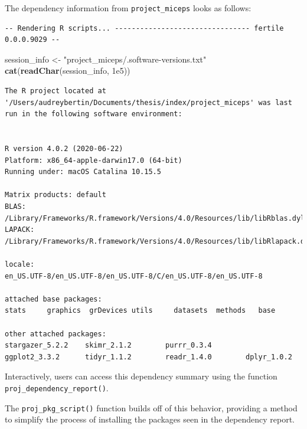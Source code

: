 \documentclass[12pt,twoside]{reedthesis}
\newenvironment{Shaded}{\begin{snugshade}}{\end{snugshade}}
\newcommand{\KeywordTok}[1]{\textcolor[rgb]{0.13,0.29,0.53}{\textbf{#1}}}
\newcommand{\FloatTok}[1]{\textcolor[rgb]{0.00,0.00,0.81}{#1}}
\newcommand{\StringTok}[1]{\textcolor[rgb]{0.31,0.60,0.02}{#1}}
\newcommand{\NormalTok}[1]{#1}
\begin{document}
The dependency information from \texttt{project\_miceps} looks as
follows:
\begin{verbatim}
-- Rendering R scripts... -------------------------------- fertile 0.0.0.9029 --
\end{verbatim}
\begin{Shaded}
\begin{Highlighting}[]
\NormalTok{session_info <-}\StringTok{ "project_miceps/.software-versions.txt"}
\KeywordTok{cat}\NormalTok{(}\KeywordTok{readChar}\NormalTok{(session_info, }\FloatTok{1e5}\NormalTok{))}
\end{Highlighting}
\end{Shaded}
\begin{verbatim}
The R project located at '/Users/audreybertin/Documents/thesis/index/project_miceps' was last run in the following software environment:


R version 4.0.2 (2020-06-22)
Platform: x86_64-apple-darwin17.0 (64-bit)
Running under: macOS Catalina 10.15.5

Matrix products: default
BLAS:   /Library/Frameworks/R.framework/Versions/4.0/Resources/lib/libRblas.dylib
LAPACK: /Library/Frameworks/R.framework/Versions/4.0/Resources/lib/libRlapack.dylib

locale:
en_US.UTF-8/en_US.UTF-8/en_US.UTF-8/C/en_US.UTF-8/en_US.UTF-8

attached base packages:
stats     graphics  grDevices utils     datasets  methods   base     

other attached packages:
stargazer_5.2.2    skimr_2.1.2        purrr_0.3.4       
ggplot2_3.3.2      tidyr_1.1.2        readr_1.4.0        dplyr_1.0.2       
\end{verbatim}
Interactively, users can access this dependency summary using the
function \texttt{proj\_dependency\_report()}.

The \texttt{proj\_pkg\_script()} function builds off of this behavior,
providing a method to simplify the process of installing the packages
seen in the dependency report.
\end{document}
